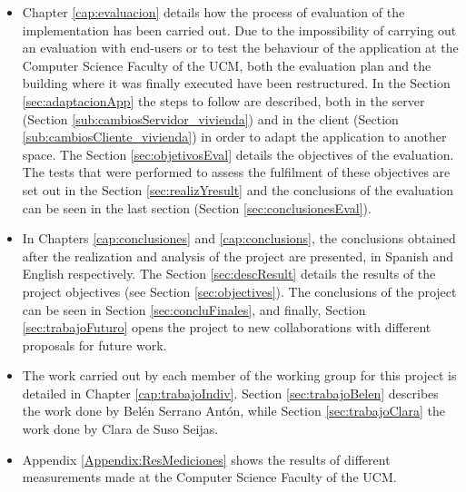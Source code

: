\begin{itemize}
	\item Chapter \ref{cap:evaluacion} details how the process of evaluation of the implementation has been carried out. Due to the impossibility of carrying out an evaluation with end-users or to test the behaviour of the application at the Computer Science Faculty of the UCM, both the evaluation plan and the building where it was finally executed have been restructured. In the Section \ref{sec:adaptacionApp} the steps to follow are described, both in the server (Section \ref{sub:cambiosServidor_vivienda}) and in the client (Section \ref{sub:cambiosCliente_vivienda}) in order to adapt the application to another space. The Section \ref{sec:objetivosEval} details the objectives of the evaluation. The tests that were performed to assess the fulfilment of these objectives are set out in the Section \ref{sec:realizYresult} and the conclusions of the evaluation can be seen in the last section (Section \ref{sec:conclusionesEval}).
	
	\item In Chapters \ref{cap:conclusiones} and \ref{cap:conclusions}, the conclusions obtained after the realization and analysis of the project are presented, in Spanish and English respectively. The Section \ref{sec:descResult} details the results of the project objectives (see Section \ref{sec:objectives}). The conclusions of the project can be seen in Section \ref{sec:concluFinales}, and finally, Section \ref{sec:trabajoFuturo} opens the project to new collaborations with different proposals for future work.
	
	\item The work carried out by each member of the working group for this project is detailed in Chapter \ref{cap:trabajoIndiv}. Section \ref{sec:trabajoBelen} describes the work done by Belén Serrano Antón, while Section \ref{sec:trabajoClara} the work done by Clara de Suso Seijas.
	
	\item Appendix \ref{Appendix:ResMediciones} shows the results of different measurements made at the Computer Science Faculty of the UCM.
	
\end{itemize}










